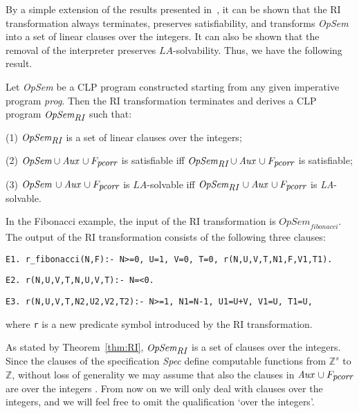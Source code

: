 \documentclass[english]{tlp}
\newcommand{\tts}{\tt \small}
\begin{document}
By a simple extension of the results presented in~\cite{De&14c},
it can be shown that the RI transformation always terminates, 
preserves satisfiability, and transforms \textit{OpSem} into a set of
linear clauses over the integers.
It can also be shown that the removal of the interpreter preserves 
\mbox{${\textit{LA}}$-solvability.} 
	Thus, we have the following result.


\vspace{-.5mm}
\begin{theorem}
Let \textit{OpSem} be a CLP program constructed starting from any given 
imperative program \textit{prog}.\label{thm:RI}
Then the RI transformation terminates and derives a CLP program $\textit{OpSem}_{\textit{\small{RI}}}$ such that:

\noindent
(1) $\textit{OpSem}_{\textit{\small{RI}}}$ is a set of linear clauses over the integers;

\noindent
(2) $\textit{OpSem} \cup \textit{Aux}\, \cup F_{\textit{\small{pcorr}}}$ is satisfiable iff 
$\textit{OpSem}_{\textit{\small{RI}}} \cup \textit{Aux}\, \cup F_{\textit{\small{pcorr}}}$ is satisfiable;

\noindent
(3) $\textit{OpSem}\, \cup \textit{Aux}\, \cup F_{\textit{\small{pcorr}}}$ is 
${\textit{LA}}$-solvable iff $\textit{OpSem}_{\textit{\small{RI}}}\, \cup 
\textit{Aux}\, \cup F_{\textit{\small{pcorr}}}$ is {\textit{LA}}-solvable.
\end{theorem}

\noindent
In the Fibonacci example, the input of the
RI transformation is $\textit{OpSem}_{\textit{fibonacci}}$. 
The output of the
RI transformation consists of the following three clauses:

{\small{
\noindent
{\tt{E1.~r\_fibonacci(N,F):- N>=0,\,U=1,\,V=0,\,T=0,\,r(N,U,V,T,N1,F,V1,T1).}}\rule{0mm}{3.5mm}

\noindent
{\tt{E2.~r(N,U,V,T,N,U,V,T):- N=<0.}}


\noindent
{\tt{E3.~r(N,U,V,T,N2,U2,V2,T2):- N>=1,\,N1=N-1,\,U1=U+V,\,V1=U,\,T1=U,}}


}} \noindent
where {\tts r} is a new predicate symbol introduced by the
RI transformation.

As stated by Theorem~\ref{thm:RI}, $\textit{OpSem}_{\textit{\small{RI}}}$ is a set of
clauses over the integers. Since the clauses of the specification {\it Spec} define
computable functions from $\mathbb Z ^s$ to $\mathbb Z$, without loss of generality we may assume that also
the clauses in $\textit{Aux}\, \cup F_{\textit{\small{pcorr}}}$ are over the integers \cite{SeS82}.
From now on we will only deal with clauses over the integers, and
we will feel free to omit the qualification `over the integers'.
\end{document}
